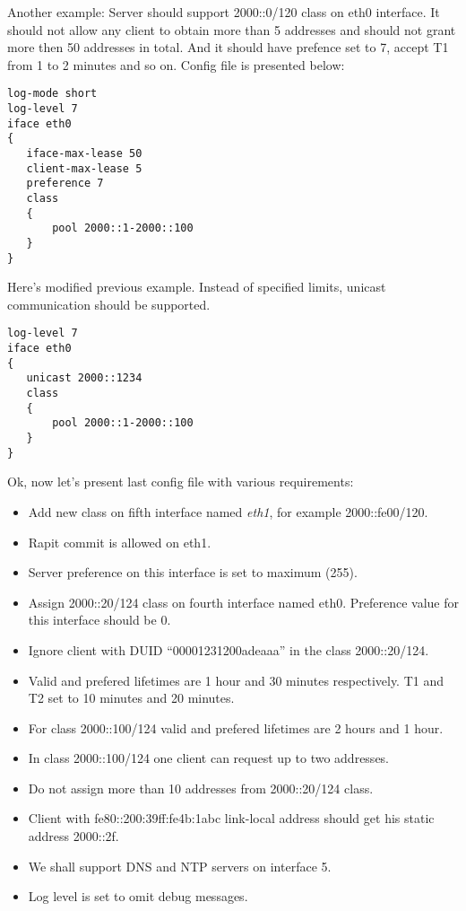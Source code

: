 Another example: Server should support 2000::0/120 class on eth0
interface. It should not allow any client to obtain more than 5
addresses and should not grant more then 50 addresses in total. And it
should have prefence set to 7, accept T1 from 1 to 2 minutes and so
on. Config file is presented below:

\begin{verbatim}
log-mode short
log-level 7
iface eth0
{
   iface-max-lease 50
   client-max-lease 5
   preference 7
   class
   {
       pool 2000::1-2000::100
   }
}  
\end{verbatim}

Here's modified previous example. Instead of specified limits, unicast
communication should be supported.

\begin{verbatim}
log-level 7
iface eth0
{
   unicast 2000::1234
   class
   {
       pool 2000::1-2000::100
   }
}  
\end{verbatim}

Ok, now let's present last config file with various requirements:
\begin{itemize}
\item Add new class on fifth interface named \emph{eth1}, for example 2000::fe00/120.
\item Rapit commit is allowed on eth1.
\item Server preference on this interface is set to maximum (255).
\item Assign 2000::20/124 class on fourth interface named
  eth0. Preference value for this interface should be 0.
\item Ignore client with DUID ``00001231200adeaaa'' in the class
  2000::20/124.
\item Valid and prefered lifetimes are 1 hour and 30 minutes
  respectively. T1 and T2 set to 10 minutes and 20 minutes.
\item For class 2000::100/124 valid and prefered lifetimes are 2 hours
  and 1 hour.
\item In class 2000::100/124 one client can request up to two
  addresses.
\item Do not assign more than 10 addresses from 2000::20/124 class.
\item Client with fe80::200:39ff:fe4b:1abc link-local address should
  get his static address 2000::2f.
\item We shall support DNS and NTP servers on interface 5. 
\item Log level is set to omit debug messages.
\end{itemize}

